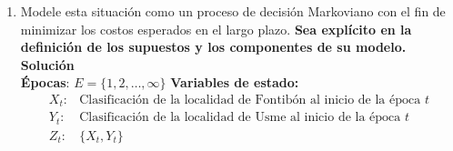 \begin{enumerate}[label=\alph*.]
    \item Modele esta situación como un proceso de decisión Markoviano con el fin de minimizar los costos esperados en el largo plazo. \textbf{Sea explícito en la definición de los supuestos y los componentes de su modelo.} \\


\noindent \textbf{Solución} \\

\noindent \textbf{Épocas}: $E=\{1,2,\dots, \infty\}$
\noindent \textbf{Variables de estado:}
\begin{align*}
    X_{t}:&\text{Clasificación de la localidad de Fontibón al inicio de la época } t \\
    Y_{t}:&\text{Clasificación de la localidad de Usme al inicio de la época } t \\
    Z_{t}:&\{X_{t},Y_{t}\}
\end{align*}


\end{enumerate}
